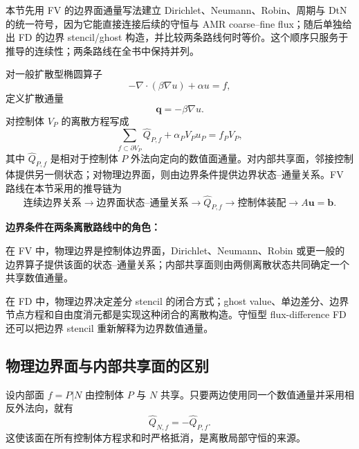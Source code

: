本节先用 FV 的边界面通量写法建立 Dirichlet、Neumann、Robin、周期与 DtN 的统一符号，因为它能直接连接后续的守恒与 AMR coarse--fine flux；随后单独给出 FD 的边界 stencil/ghost 构造，并比较两条路线何时等价。这个顺序只服务于推导的连续性；两条路线在全书中保持并列。

对一般扩散型椭圆算子
\begin{equation}
-\nabla\cdot(\beta\nabla u)+\alpha u=f,
\end{equation}
定义扩散通量
\begin{equation}
\bm q=-\beta\nabla u.
\end{equation}
对控制体 $V_P$ 的离散方程写成
\begin{equation}
\boxed{
\sum_{f\subset\partial V_P}\widehat Q_{P,f}
+\alpha_PV_Pu_P
=f_PV_P,
}
\label{eq:discretization-boundary-control-volume-balance}
\end{equation}
其中 $\widehat Q_{P,f}$ 是相对于控制体 $P$ 外法向定向的数值面通量。对内部共享面，邻接控制体提供另一侧状态；对物理边界面，则由边界条件提供边界状态--通量关系。FV 路线在本节采用的推导链为
\begin{equation}
\boxed{
\text{连续边界关系}
\longrightarrow
\text{边界面状态--通量关系}
\longrightarrow
\widehat Q_{P,f}
\longrightarrow
\text{控制体装配}
\longrightarrow
A\bm u=\bm b.
}
\label{eq:discretization-bc-chain}
\end{equation}

\begin{keybox}
\textbf{边界条件在两条离散路线中的角色：}

在 FV 中，物理边界是控制体边界面，Dirichlet、Neumann、Robin 或更一般的边界算子提供该面的状态--通量关系；内部共享面则由两侧离散状态共同确定一个共享数值通量。

在 FD 中，物理边界决定差分 stencil 的闭合方式；ghost value、单边差分、边界节点方程和自由度消元都是实现这种闭合的离散构造。守恒型 flux-difference FD 还可以把边界 stencil 重新解释为边界数值通量。
\end{keybox}

\subsection{物理边界面与内部共享面的区别}
\label{sec:discretization-cell-centered-boundary}

设内部面 $f=P|N$ 由控制体 $P$ 与 $N$ 共享。只要两边使用同一个数值通量并采用相反外法向，就有
\begin{equation}
\widehat Q_{N,f}=-\widehat Q_{P,f}.
\end{equation}
这使该面在所有控制体方程求和时严格抵消，是离散局部守恒的来源。

